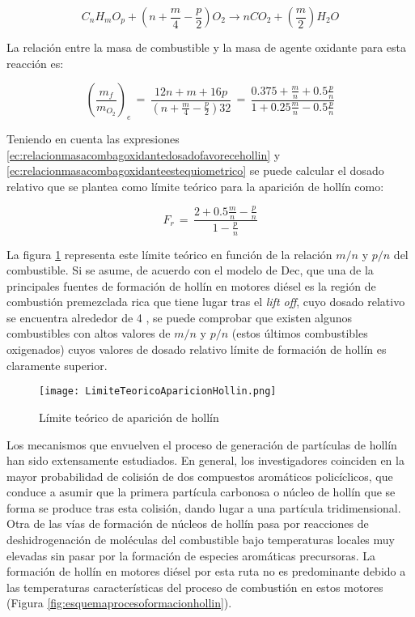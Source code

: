 \begin{equation}
\label{ec:hollinestequiometrico}
C_nH_mO_p + \left( n + \frac{m}{4} - \frac{p}{2} \right) O_2 \rightarrow nCO_2 + \left( \frac{m}{2} \right) H_2O
\end{equation}

\par La relación entre la masa de combustible y la masa de agente oxidante para esta reacción es:

\begin{equation}
\label{ec:relacionmasacombagoxidanteestequiometrico}
\left( \dfrac{m_f}{m_{O_2}} \right)_e\,=\,\dfrac{12n+m+16p}{\left( n + \frac{m}{4} - \frac{p}{2} \right)32}\,=\,\dfrac{0.375+\frac{m}{n}+0.5\frac{p}{n}}{1+0.25\frac{m}{n} - 0.5\frac{p}{n}}
\end{equation}

\par Teniendo en cuenta las expresiones \ref{ec:relacionmasacombagoxidantedosadofavorecehollin} y \ref{ec:relacionmasacombagoxidanteestequiometrico} se puede calcular el dosado relativo que se plantea como límite teórico para la aparición de hollín como:

\begin{equation}
\label{ec:dosadorelativoaparicionhollin}
F_r\,=\, \dfrac{2+0.5\frac{m}{n}-\frac{p}{n}}{1-\frac{p}{n}}
\end{equation}

La figura \ref{fig:limiteteoricoaparicionhollin} representa este límite teórico en función de la relación $m/n$ y $p/n$ del combustible. Si se asume, de acuerdo con el modelo de Dec, que una de la principales fuentes de formación de hollín en motores diésel es la región de combustión premezclada rica que tiene lugar tras el \textit{lift off}, cuyo dosado relativo se encuentra alrededor de 4 \cite{lapuertaetal:2010}, se puede comprobar que existen algunos combustibles con altos valores de $m/n$ y $p/n$ (estos últimos combustibles oxigenados) cuyos valores de dosado relativo límite de formación de hollín es claramente superior.

\begin{figure}[ht]
\centering
	\texttt{[image: LimiteTeoricoAparicionHollin.png]}	 
	\caption{Límite teórico de aparición de hollín} \label{fig:limiteteoricoaparicionhollin}
\end{figure} 

\par Los mecanismos que envuelven el proceso de generación de partículas de hollín han sido extensamente estudiados. En general, los investigadores coinciden en la mayor probabilidad de colisión de dos compuestos aromáticos policíclicos, que conduce a asumir que la primera partícula carbonosa o núcleo de hollín que se forma se produce tras esta colisión, dando lugar a una partícula tridimensional. Otra de las vías de formación de núcleos de hollín pasa por reacciones de deshidrogenación de moléculas del combustible bajo temperaturas locales muy elevadas sin pasar por la formación de especies aromáticas precursoras. La formación de hollín en motores diésel por esta ruta no es predominante debido a las temperaturas características del proceso de combustión en estos motores (Figura \ref{fig:esquemaprocesoformacionhollin}).

